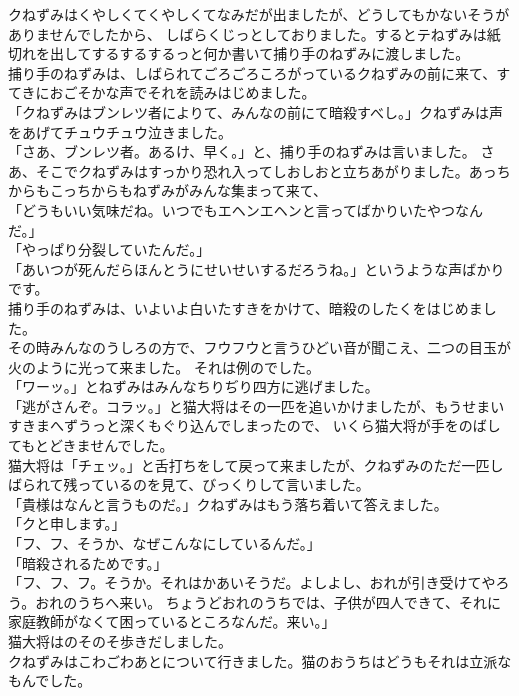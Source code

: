 \documentclass[
a4paper,
10pt,
book]
{tarticle}
\begin{document}
\indent クねずみはくやしくてくやしくてなみだが出ましたが、どうしてもかないそうがありませんでしたから、
しばらくじっとしておりました。するとテねずみは紙切れを出してするするするっと何か書いて捕り手のねずみに渡しました。\\
\indent 捕り手のねずみは、しばられてごろごろころがっているクねずみの前に来て、すてきにおごそかな声でそれを読みはじめました。\\
「クねずみはブンレツ者によりて、みんなの前にて暗殺すべし。」クねずみは声をあげてチュウチュウ泣きました。\\
「さあ、ブンレツ者。あるけ、早く。」と、捕り手のねずみは言いました。
さあ、そこでクねずみはすっかり恐れ入ってしおしおと立ちあがりました。あっちからもこっちからもねずみがみんな集まって来て、\\
「どうもいい気味だね。いつでもエヘンエヘンと言ってばかりいたやつなんだ。」\\
「やっぱり分裂していたんだ。」\\
「あいつが死んだらほんとうにせいせいするだろうね。」というような声ばかりです。\\
\indent 捕り手のねずみは、いよいよ白いたすきをかけて、暗殺のしたくをはじめました。\\
\indent その時みんなのうしろの方で、フウフウと言うひどい音が聞こえ、二つの目玉が火のように光って来ました。
それは例のでした。\\
「ワーッ。」とねずみはみんなちりぢり四方に逃げました。\\
「逃がさんぞ。コラッ。」と猫大将はその一匹を追いかけましたが、もうせまいすきまへずうっと深くもぐり込んでしまったので、
いくら猫大将が手をのばしてもとどきませんでした。\\
\indent 猫大将は「チェッ。」と舌打ちをして戻って来ましたが、クねずみのただ一匹しばられて残っているのを見て、びっくりして言いました。\\
「貴様はなんと言うものだ。」クねずみはもう落ち着いて答えました。\\
「クと申します。」\\
「フ、フ、そうか、なぜこんなにしているんだ。」\\
「暗殺されるためです。」\\
「フ、フ、フ。そうか。それはかあいそうだ。よしよし、おれが引き受けてやろう。おれのうちへ来い。
ちょうどおれのうちでは、子供が四人できて、それに家庭教師がなくて困っているところなんだ。来い。」\\
\indent 猫大将はのそのそ歩きだしました。\\
\indent クねずみはこわごわあとについて行きました。猫のおうちはどうもそれは立派なもんでした。
\end{document}
